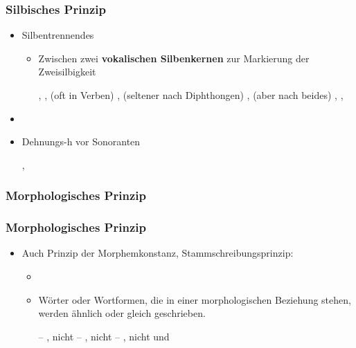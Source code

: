 \begin{frame}
\frametitle{Silbisches Prinzip}

\begin{itemize}
	\item Silbentrennendes 
	
	\begin{itemize}
		\item Zwischen zwei \textbf{vokalischen Silbenkernen} \ras zur Markierung der Zweisilbigkeit
		
		
		  \eal
                  \ex {}, , 
		  \ex (oft in Verben) , 
		  \ex (seltener nach Diphthongen) , 
		  \ex (aber nach  beides) , , 
                  \zl
		
	\end{itemize}
	\item[]
	\item Dehnungs-h vor Sonoranten

	  \ea
          , 
          \z

\end{itemize}


\end{frame}


\subsubsection{Morphologisches Prinzip}


\begin{frame}
\frametitle{Morphologisches Prinzip}

\begin{itemize}
	\item Auch Prinzip der Morphemkonstanz, Stammschreibungsprinzip:
	
	\begin{itemize}
		\item[]
		\item Wörter oder Wortformen, die in einer morphologischen Beziehung stehen, werden ähnlich oder gleich geschrieben.
		
		  \eal
                  \ex {} -- , nicht 
		  \ex {} -- , nicht 
		  \ex {} -- , nicht  und 
                  \zl
			 
	\end{itemize}
\end{itemize}


\end{frame}



